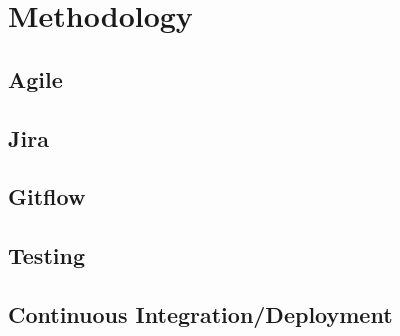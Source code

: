 \section{Methodology}
\label{sec:methodology}
\subsection{Agile}
\subsection{Jira}
\subsection{Gitflow}
\subsection{Testing}
\subsection{Continuous Integration/Deployment}
